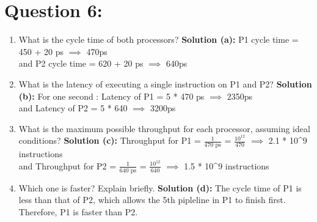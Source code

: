 \documentclass[11pt]{article}
\newenvironment{qparts}{\begin{enumerate}[{(}a{)}]}{\end{enumerate}}
\begin{document}
\section *{Question 6: }
\begin{qparts}
\item What is the cycle time of both processors? 
\newline 
\textbf{Solution (a): } P1 cycle time = 450 + 20 ps $\implies$ 470ps \\ and P2 cycle time = 620 + 20 ps $\implies$ 640ps

\item What is the latency of executing a single instruction on P1 and P2? 
\newline
\textbf{Solution (b): } For one second : Latency of P1 = 5 * 470 ps $\implies$ 2350ps \\ and Latency of P2 = 5 * 640 $\implies$ 3200ps

\item What is the maximum possible throughput for each processor, assuming ideal conditions? 
\newline
\textbf{Solution (c): } Throughput for P1 = $\frac{1}{470 \text{ ps}}$ = $\frac{10^{12}}{470}$ $\implies$ 2.1 * 10^9 instructions \\ and Throughput for P2 = $\frac{1}{640 \text{ ps}}$ = $\frac{10^{12}}{640}$ $\implies$ 1.5 * 10^9 instructions

\item Which one is faster? Explain briefly.
\newline 
\textbf{Solution (d): } The cycle time of P1 is less than that of P2, which allows the 5th pipleline in P1 to finish first. Therefore, P1 is faster than P2.
\end{qparts}





\
\end{document}
